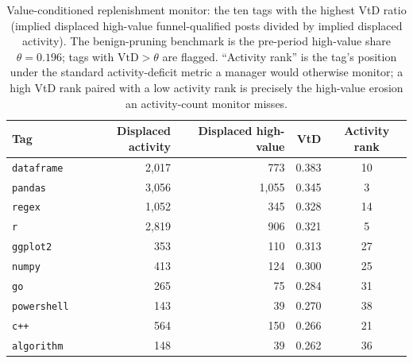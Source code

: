 \begin{table}[ht]
\centering
\caption{Value-conditioned replenishment monitor: the ten tags with the highest VtD ratio (implied displaced high-value funnel-qualified posts divided by implied displaced activity). The benign-pruning benchmark is the pre-period high-value share $\theta = 0.196$; tags with $\text{VtD} > \theta$ are flagged. ``Activity rank'' is the tag's position under the standard activity-deficit metric a manager would otherwise monitor; a high VtD rank paired with a low activity rank is precisely the high-value erosion an activity-count monitor misses.}
\label{tab:vtd_monitor}
\small
\begin{tabular}{lrrrc}
\toprule
Tag & Displaced activity & Displaced high-value & VtD & Activity rank \\
\midrule
\texttt{dataframe} & 2,017 & 773 & 0.383 & 10 \\
\texttt{pandas} & 3,056 & 1,055 & 0.345 & 3 \\
\texttt{regex} & 1,052 & 345 & 0.328 & 14 \\
\texttt{r} & 2,819 & 906 & 0.321 & 5 \\
\texttt{ggplot2} & 353 & 110 & 0.313 & 27 \\
\texttt{numpy} & 413 & 124 & 0.300 & 25 \\
\texttt{go} & 265 & 75 & 0.284 & 31 \\
\texttt{powershell} & 143 & 39 & 0.270 & 38 \\
\texttt{c++} & 564 & 150 & 0.266 & 21 \\
\texttt{algorithm} & 148 & 39 & 0.262 & 36 \\
\bottomrule
\end{tabular}
\end{table}
